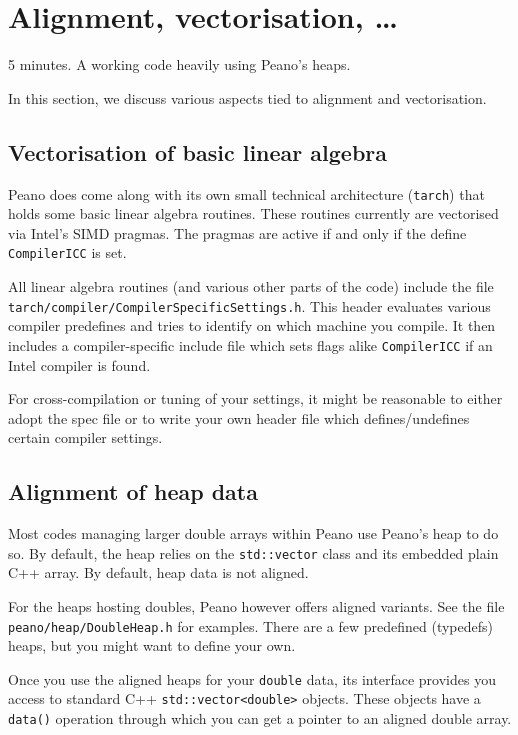 \section{Alignment, vectorisation, \ldots}

\chapterDescription
  {
    5 minutes.
  }
  {
    A working code heavily using Peano's heaps.
  }


In this section, we discuss various aspects tied to alignment and vectorisation. 


\subsection{Vectorisation of basic linear algebra}

Peano does come along with its own small technical architecture (\texttt{tarch})
that holds some basic linear algebra routines. These routines currently are
vectorised via Intel's SIMD pragmas. The pragmas are active if and only if the
define \texttt{CompilerICC} is set. 

All linear algebra routines (and various other parts of the code) include the
file \linebreak
\texttt{tarch/compiler/CompilerSpecificSettings.h}.
This header evaluates various compiler predefines and tries to identify on which
machine you compile.
It then includes a compiler-specific include file which sets flags alike 
\texttt{CompilerICC} if an Intel compiler is found.

For cross-compilation or tuning of your settings, it might be reasonable to
either adopt the spec file or to write your own header file which
defines/undefines certain compiler settings.


\subsection{Alignment of heap data}

Most codes managing larger double arrays within Peano use Peano's heap to do so. 
By default, the heap relies on the \texttt{std::vector} class and its embedded 
plain C++ array. 
By default, heap data is not aligned.


For the heaps hosting doubles, Peano however offers aligned variants. See the
file \linebreak
\texttt{peano/heap/DoubleHeap.h} for examples. 
There are a few predefined (typedefs) heaps, but you might want to define your
own.


Once you use the aligned heaps for your \texttt{double} data, its interface
provides you access to standard C++ \texttt{std::vector<double>} objects.
These objects have a \texttt{data()} operation through which you can get a 
pointer to an aligned double array.

